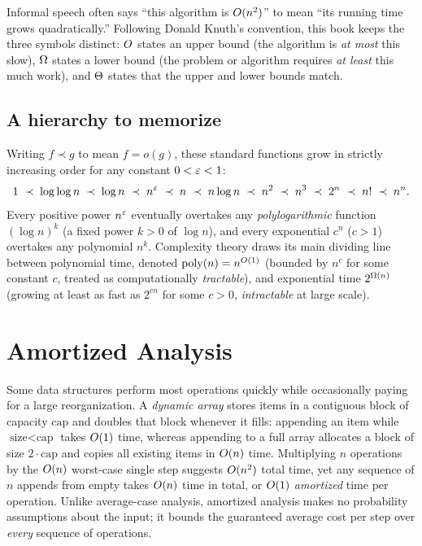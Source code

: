 \begin{connectionbox}
Informal speech often says ``this algorithm is $O(n^2)$'' to mean ``its running time grows quadratically.'' Following Donald Knuth's convention, this book keeps the three symbols distinct: $O$ states an upper bound (the algorithm is \emph{at most} this slow), $\Omega$ states a lower bound (the problem or algorithm requires \emph{at least} this much work), and $\Theta$ states that the upper and lower bounds match.
\end{connectionbox}

\subsection{A hierarchy to memorize}

Writing $f \prec g$ to mean $f = o(g)$, these standard functions grow in strictly increasing order for any constant $0 < \varepsilon < 1$:
\[
1 \;\prec\; \log\log n \;\prec\; \log n \;\prec\; n^{\varepsilon} \;\prec\; n \;\prec\; n\log n \;\prec\; n^2
\;\prec\; n^3 \;\prec\; 2^n \;\prec\; n! \;\prec\; n^n.
\]
Every positive power $n^{\varepsilon}$ eventually overtakes any \emph{polylogarithmic} function $(\log n)^k$ (a fixed power $k > 0$ of $\log n$), and every exponential $c^n$ ($c > 1$) overtakes any polynomial $n^k$. Complexity theory draws its main dividing line between polynomial time, denoted $\operatorname{poly}(n) = n^{O(1)}$ (bounded by $n^c$ for some constant $c$, treated as computationally \emph{tractable}), and exponential time $2^{\Omega(n)}$ (growing at least as fast as $2^{cn}$ for some $c > 0$, \emph{intractable} at large scale).

\section{Amortized Analysis}
\label{ch42:amortized}

Some data structures perform most operations quickly while occasionally paying for a large reorganization. A \emph{dynamic array} stores items in a contiguous block of capacity $\text{cap}$ and doubles that block whenever it fills: appending an item while $\text{size} < \text{cap}$ takes $O(1)$ time, whereas appending to a full array allocates a block of size $2\cdot\text{cap}$ and copies all existing items in $O(n)$ time. Multiplying $n$ operations by the $O(n)$ worst-case single step suggests $O(n^2)$ total time, yet any sequence of $n$ appends from empty takes $O(n)$ time in total, or $O(1)$ \emph{amortized} time per operation. Unlike average-case analysis, amortized analysis makes no probability assumptions about the input; it bounds the guaranteed average cost per step over \emph{every} sequence of operations.


